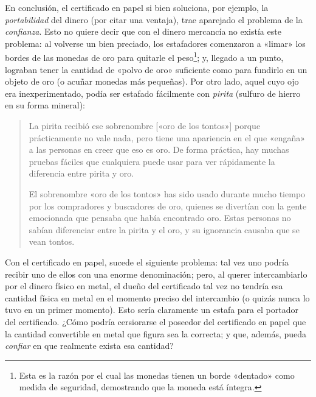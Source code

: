 \documentclass[12pt,a4paper,twoside]{book}
\begin{document}
En conclusión, el certificado en papel si bien soluciona, por ejemplo, la \textit{portabilidad} del dinero (por citar una ventaja), trae aparejado el problema de la \textit{confianza}. Esto no quiere decir que con el dinero mercancía no existía este problema: al volverse un bien preciado, los estafadores comenzaron a «limar» los bordes de las monedas de oro para quitarle el peso\footnote{Esta es la razón por el cual las monedas tienen un borde «dentado» como medida de seguridad, demostrando que la moneda está íntegra.}; y, llegado a un punto, lograban tener la cantidad de «polvo de oro» suficiente como para fundirlo en un objeto de oro (o acuñar monedas más pequeñas). Por otro lado, aquel cuyo ojo era inexperimentado, podía ser estafado fácilmente con \textit{pirita} (sulfuro de hierro en su forma mineral):

\begin{quotation}
La pirita recibió ese sobrenombre [«oro de los tontos»] porque prácticamente no vale nada, pero tiene una apariencia en el que «engaña» a las personas en creer que eso es oro. De forma práctica, hay muchas pruebas fáciles que cualquiera puede usar para ver rápidamente la diferencia entre pirita y oro.

El sobrenombre «oro de los tontos» has sido usado durante mucho tiempo por los compradores y buscadores de oro, quienes se divertían con la gente emocionada que pensaba que había encontrado oro. Estas personas no sabían diferenciar entre la pirita y el oro, y su ignorancia causaba que se vean tontos. \cite{sulfuro-hierro}
\end{quotation}

Con el certificado en papel, sucede el siguiente problema: tal vez uno podría recibir uno de ellos con una enorme denominación; pero, al querer intercambiarlo por el dinero físico en metal, el dueño del certificado tal vez no tendría esa cantidad física en metal en el momento preciso del intercambio (o quizás nunca lo tuvo en un primer momento). Esto sería claramente un estafa para el portador del certificado. ¿Cómo podría cersiorarse el poseedor del certificado en papel que la cantidad convertible en metal que figura sea la correcta; y que, además, pueda \textit{confiar} en que realmente exista esa cantidad?
\end{document}
